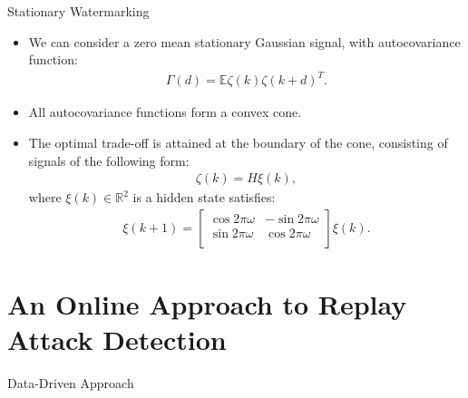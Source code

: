\documentclass[10pt]{beamer}
\newcommand{\tikzdir}[1]{#1.tikz}
\newcommand{\inputtikz}[1]{}}
\begin{document}
\begin{frame}{Stationary Watermarking}
  \begin{itemize}
    \item We can consider a zero mean stationary Gaussian signal, with autocovariance function:
      \begin{align*}
	\Gamma(d) = \mathbb E \zeta(k)\zeta(k+d)^T.
      \end{align*}
    \item All autocovariance functions form a convex cone.
    \item The optimal trade-off is attained at the boundary of the cone, consisting of signals of the following form: 
      \begin{align*}
        \zeta(k) = H \xi(k),
      \end{align*}
      where $\xi(k)\in \mathbb R^2$ is a hidden state satisfies:
      \begin{align*}
      \xi(k+1) = \begin{bmatrix}
	  \cos 2\pi\omega & -\sin 2\pi\omega \\
	  \sin 2\pi\omega & \cos 2\pi\omega \\
	\end{bmatrix} \xi(k).
      \end{align*}
  \end{itemize} 
\end{frame}

\section{An Online Approach to Replay Attack Detection}

\begin{frame}{Data-Driven Approach}
  \begin{figure}[htpb]
    \inputtikz{systemdiagram2}
  \end{figure}
\end{frame}
\end{document}
